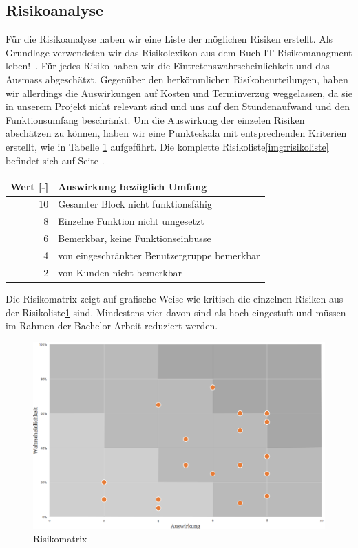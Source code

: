 \subsection{Risikoanalyse}
Für die Risikoanalyse haben wir eine Liste der möglichen  Risiken erstellt. Als Grundlage verwendeten wir das Risikolexikon aus dem Buch \flqq IT-Risikomanagment leben!\frqq ~\cite{AhrendtsFabian2008Il:w}. 
Für jedes Risiko haben wir die Eintretenswahrscheinlichkeit und das Ausmass abgeschätzt. Gegenüber den herkömmlichen Risikobeurteilungen, haben wir allerdings die Auswirkungen auf Kosten und Terminverzug weggelassen, da sie in unserem Projekt nicht relevant sind und uns auf den Stundenaufwand und den Funktionsumfang beschränkt. Um die Auswirkung der einzelen Risiken abschätzen zu können, haben wir eine Punkteskala mit entsprechenden Kriterien erstellt, wie in Tabelle \ref{tab:auswirkung} aufgeführt. Die komplette Risikoliste\ref{img:risikoliste} befindet sich auf Seite \pageref{img:risikoliste}.

\vspace{5mm} %

\begin{table}[h]
\centering
\label{tab:auswirkung}
\begin{tabular}{rl}
Wert	[-]	& 	Auswirkung bezüglich Umfang \\
\hline
10	&	Gesamter Block nicht funktionsfähig \\
8	&	Einzelne Funktion nicht umgesetzt  \\
6	&	Bemerkbar, keine Funktionseinbusse \\
4	&	von eingeschränkter Benutzergruppe bemerkbar \\
2	&	von Kunden nicht bemerkbar
\end{tabular}
\end{table}

Die Risikomatrix zeigt auf grafische Weise wie kritisch die einzelnen Risiken aus der Risikoliste\ref{img:risikomatrix}  sind. Mindestens vier davon sind als hoch eingestuft und müssen im Rahmen der Bachelor-Arbeit reduziert werden.

\begin{figure}[h!]
	\centering
	\includegraphics[width=0.6\linewidth]{img/risikomatrix} 
	\caption{Risikomatrix}
	\label{img:risikomatrix}
\end{figure}



